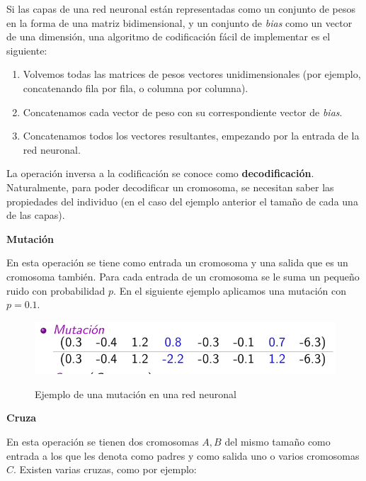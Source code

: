\documentclass[twocolumn,spanish]{revtex4-1}
\begin{document}
Si las capas de una red neuronal están representadas como un conjunto de pesos en la forma de una matriz bidimensional, y un conjunto de \textit{bias} como un vector de una dimensión, una algoritmo de codificación fácil de implementar es el siguiente:
\begin{enumerate}
    \item Volvemos todas las matrices de pesos vectores unidimensionales (por ejemplo, concatenando fila por fila, o columna por columna).
    \item Concatenamos cada vector de peso con su correspondiente vector de \textit{bias}.
    \item Concatenamos todos los vectores resultantes, empezando por la entrada de la red neuronal.
\end{enumerate}

La operación inversa a la codificación se conoce como \textbf{decodificación}. Naturalmente, para poder decodificar un cromosoma, se necesitan saber las propiedades del individuo (en el caso del ejemplo anterior el tamaño de cada una de las capas).

\textbf{Mutación}

En esta operación se tiene como entrada un cromosoma y una salida que es un cromosoma también. Para cada entrada de un cromosoma se le suma un pequeño ruido con probabilidad $p$. En el siguiente ejemplo aplicamos una mutación con $p=0.1$.

\begin{figure}[H]
    \centering
    \includegraphics[width=0.9\linewidth]{images/mutacion.png}
    \begin{quote}
    \caption{Ejemplo de una mutación en una red neuronal 
    \protect\cite{profa}}
    \end{quote}
    \label{fig:mutacion}
\end{figure}

\textbf{Cruza}

En esta operación se tienen dos cromosomas $A, B$ del mismo tamaño como entrada a los que les denota como padres y como salida uno o varios cromosomas $C$. Existen varias cruzas, como por ejemplo:
\end{document}
